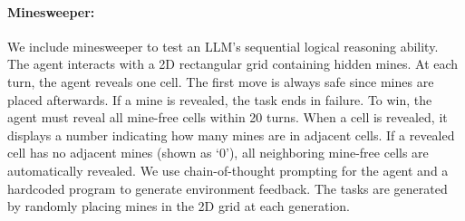 \documentclass{article}
\theoremstyle{plain}
\theoremstyle{definition}
\theoremstyle{remark}
\begin{document}
\paragraph{Minesweeper: } We include minesweeper to test an LLM's sequential logical reasoning ability. The agent interacts with a 2D rectangular grid containing hidden mines. At each turn, the agent reveals one cell. The first move is always safe since mines are placed afterwards. If a mine is revealed, the task ends in failure. To win, the agent must reveal all mine-free cells within 20 turns. When a cell is revealed, it displays a number indicating how many mines are in adjacent cells. If a revealed cell has no adjacent mines (shown as `0'), all neighboring mine-free cells are automatically revealed. We use chain-of-thought prompting for the agent and a hardcoded program to generate environment feedback. The tasks are generated by randomly placing mines in the 2D grid at each generation.
\end{document}
